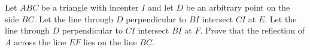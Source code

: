 Let $ABC$ be a triangle with incenter $I$ and let $D$ be an arbitrary point on the side $BC$. Let the line through $D$ perpendicular to $BI$ intersect $CI$ at $E$. Let the line through $D$ perpendicular to $CI$ intersect $BI$ at $F$. Prove that the reflection of $A$ across the line $EF$ lies on the line $BC$.